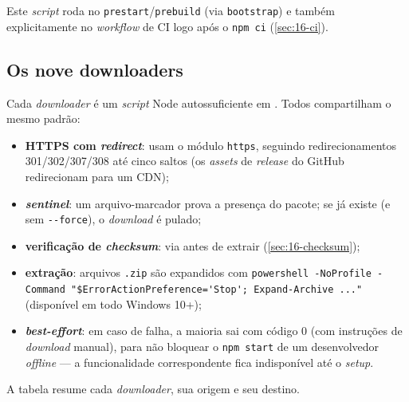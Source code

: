 Este \emph{script} roda no \texttt{prestart}/\texttt{prebuild} (via
\texttt{bootstrap}) e também explicitamente no \emph{workflow} de CI logo após o
\lstinline|npm ci| (\autoref{sec:16-ci}).

\subsection{Os nove downloaders}
\label{sec:16-downloaders}

Cada \emph{downloader} é um \emph{script} Node autossuficiente em
. Todos compartilham o mesmo padrão:

\begin{itemize}[nosep]
  \item \textbf{HTTPS com \emph{redirect}}: usam o módulo \lstinline|https|,
        seguindo redirecionamentos 301/302/307/308 até cinco saltos
        (os \emph{assets} de \emph{release} do GitHub redirecionam para um CDN);
  \item \textbf{\emph{sentinel}}: um arquivo-marcador prova a presença do pacote;
        se já existe (e sem \lstinline|--force|), o \emph{download} é pulado;
  \item \textbf{verificação de \emph{checksum}}: via
         antes de extrair
        (\autoref{sec:16-checksum});
  \item \textbf{extração}: arquivos \texttt{.zip} são expandidos com
        \lstinline|powershell -NoProfile -Command "$ErrorActionPreference='Stop'; Expand-Archive ..."|
        (disponível em todo Windows 10+);
  \item \textbf{\emph{best-effort}}: em caso de falha, a maioria sai com código 0
        (com instruções de \emph{download} manual), para não bloquear o
        \lstinline|npm start| de um desenvolvedor \emph{offline} --- a
        funcionalidade correspondente fica indisponível até o \emph{setup}.
\end{itemize}

A tabela resume cada \emph{downloader}, sua origem e seu destino.

